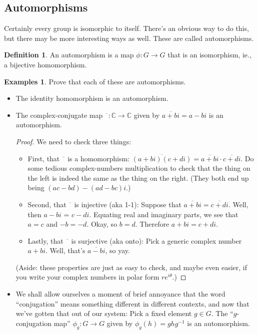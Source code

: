 \documentclass[12pt]{article}
\theoremstyle{definition} %
\newtheorem*{definition}{Definition}
\newtheorem*{example}{Examples}
\newcommand{\Alert}[1]{\textcolor{xRed}{#1}}
\newcommand{\C}{\mathbb{C}}
\newcommand\inv{^{-1}} %
\begin{document}
\subsection*{Automorphisms}
Certainly every group is isomorphic to itself. There's an obvious way to do this, but there may be more interesting ways as well. These are called \Alert{automorphisms}.

\begin{definition}
    An \Alert{automorphism} is a map $\phi:G\to G$ that is an isomorphism, ie., a bijective homomorphism.
\end{definition}

\begin{example} Prove that each of these are automorphisms.
    \begin{itemize}
        \item The identity homomorphism is an automorphism.
        \item The complex-conjugate map $\overline{\phantom{z}}:\C \to \C$ given by $\overline{a+bi} = a - bi$ is an automorphism.
        \begin{proof}
            We need to check three things:
            \begin{itemize}
                \item First, that $\overline{\phantom{z}}$ is a homomorphism: $\overline{(a+bi)(c+di)} = \overline{a+bi} \cdot \overline{c+di}$. Do some tedious complex-numbers multiplication to check that the thing on the left is indeed the same as the thing on the right. (They both end up being $(ac-bd)-(ad-bc)i$.)
                \item Second, that $\overline{\phantom{z}}$ is injective (aka 1-1): Suppose that $\overline{a+bi} = \overline{c+di}$. Well, then $a-bi$ = $c-di$. Equating real and imaginary parts, we see that $a=c$ and $-b = -d$. Okay, so $b=d$. Therefore $a+bi = c+di$.
                \item Lastly, that $\overline{\phantom{z}}$ is surjective (aka onto): Pick a generic complex number $a+bi$. Well, that's $\overline{a-bi}$, so yay.
            \end{itemize}
            (Aside: these properties are just as easy to check, and maybe even easier, if you write your complex numbers in polar form $re^{i\theta}$.)
        \end{proof}
        \item We shall allow ourselves a moment of brief annoyance that the word ``conjugation'' means something different in different contexts, and now that we've gotten that out of our system: Pick a fixed element $g\in G$. The ``$g$-conjugation map'' $\phi_g:G\to G$ given by $\phi_g(h) = ghg\inv$ is an automorphism.

\end{itemize}
\end{example}
\end{document}
